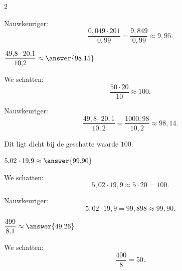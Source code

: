 \documentclass{ximera}
\begin{document}
\begin{oefening}{\oefU\ESS}
\begin{multicols}{2}
\begin{question}
\begin{oplossing}
                Nauwkeuriger:
                \[
                \dfrac{0{,}049\cdot201}{0{,}99}
                =\dfrac{9{,}849}{0{,}99}
                \approx9{,}95.
                \]
                \end{oplossing}
                \end{question}
                
                
                \begin{question}
                $\dfrac{49{,}8\cdot20{,}1}{10{,}2}\approx\answer{98.15}$
                
                \begin{oplossing}
                We schatten:
                \[
                \dfrac{50\cdot20}{10}\approx100.
                \]
                
                Nauwkeuriger:
                \[
                \dfrac{49{,}8\cdot20{,}1}{10{,}2}
                =\dfrac{1000{,}98}{10{,}2}
                \approx98{,}14.
                \]
                
                Dit ligt dicht bij de geschatte waarde $100$.
                \end{oplossing}
                \end{question}
                
                
                \begin{question}
                $5{,}02\cdot19{,}9\approx\answer{99.90}$
                
                \begin{oplossing}
                We schatten:
                \[
                5{,}02\cdot19{,}9
                \approx5\cdot20
                =100.
                \]
                
                Nauwkeuriger:
                \[
                5{,}02\cdot19{,}9
                =99{,}898
                \approx99{,}90.
                \]
                \end{oplossing}
                \end{question}
                
                
                \begin{question}
                $\dfrac{399}{8{,}1}\approx\answer{49.26}$
                
                \begin{oplossing}
                We schatten:
                \[
                \dfrac{400}{8}=50.
                \]
                

\end{oplossing}
\end{question}
\end{multicols}
\end{oefening}
\end{document}
